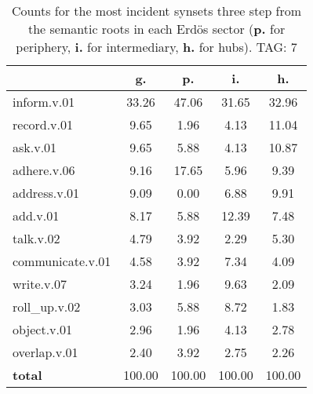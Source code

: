 \begin{table}[h!]
\begin{center}
\begin{tabular}{| l | c | c | c | c |}\hline
 & g. & p. & i. & h. \\\hline
inform.v.01 & 33.26  & 47.06  & 31.65  & 32.96 \\\hline
record.v.01 & 9.65  & 1.96  & 4.13  & 11.04 \\\hline
ask.v.01 & 9.65  & 5.88  & 4.13  & 10.87 \\\hline
adhere.v.06 & 9.16  & 17.65  & 5.96  & 9.39 \\\hline
address.v.01 & 9.09  & 0.00  & 6.88  & 9.91 \\\hline
add.v.01 & 8.17  & 5.88  & 12.39  & 7.48 \\\hline
talk.v.02 & 4.79  & 3.92  & 2.29  & 5.30 \\\hline
communicate.v.01 & 4.58  & 3.92  & 7.34  & 4.09 \\\hline
write.v.07 & 3.24  & 1.96  & 9.63  & 2.09 \\\hline
roll\_up.v.02 & 3.03  & 5.88  & 8.72  & 1.83 \\\hline
object.v.01 & 2.96  & 1.96  & 4.13  & 2.78 \\\hline
overlap.v.01 & 2.40  & 3.92  & 2.75  & 2.26 \\\hline
{{\bf total}} & 100.00  & 100.00  & 100.00  & 100.00 \\\hline
\end{tabular}
\caption{Counts for the most incident synsets three step from the semantic roots in each Erd\"os sector ({\bf p.} for periphery, {\bf i.} for intermediary, {\bf h.} for hubs). TAG: 7}
\end{center}
\end{table}